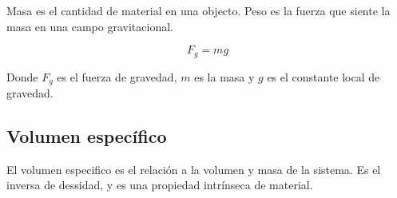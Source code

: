 \documentclass[11pt]{article}
\begin{document}
Masa es el cantidad de material en una objecto. Peso es la fuerza que siente la masa en una campo gravitacional.

\begin{equation}
	F_g=m g
\end{equation}

Donde $F_g$ es el fuerza de gravedad, $m$ es la masa y $g$ es el constante local de gravedad. 

\subsection{Volumen específico}

El volumen especifico es el relación a la volumen y masa de la sistema. Es el inversa de dessidad, y es una propiedad intr\'inseca de material.


%
%
\end{document}
